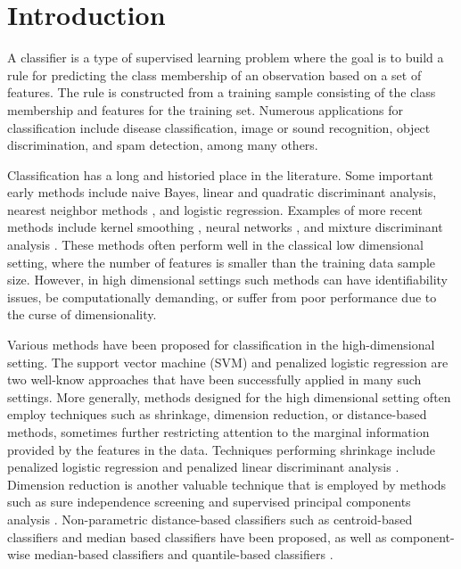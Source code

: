 
\section{Introduction}
\label{sec:intro}

A classifier is a type of supervised learning problem where the goal is to build
a rule for predicting the class membership of an observation based on a set of
features.  The rule is constructed from a training sample consisting of the
class membership and features for the training set.  Numerous applications for
classification include disease classification, image or sound recognition,
object discrimination, and spam detection, among many others.

Classification has a long and historied place in the literature.  Some important
early methods include naive Bayes, linear and quadratic discriminant analysis,
nearest neighbor methods \cite{cover1967}, and logistic regression.  Examples of
more recent methods include kernel smoothing \cite{mika1999}, neural networks
\cite{ripley1994}, and mixture discriminant analysis \cite{hastie1996}.  These
methods often perform well in the classical low dimensional setting, where the
number of features is smaller than the training data sample size.  However, in
high dimensional settings such methods can have identifiability issues, be
computationally demanding, or suffer from poor performance due to the curse of
dimensionality.

Various methods have been proposed for classification in the high-dimensional
setting.  The support vector machine (SVM) \cite{cortes1995} and penalized
logistic regression \cite{park2007} are two well-know approaches that have been
successfully applied in many such settings.  More generally, methods designed
for the high dimensional setting often employ techniques such as shrinkage,
dimension reduction, or distance-based methods, sometimes further restricting
attention to the marginal information provided by the features in the data.
Techniques performing shrinkage include penalized logistic regression and
penalized linear discriminant analysis \cite{tibshirani2002, clemmensen2011,
  witten2011}.  Dimension reduction is another valuable technique that is
employed by methods such as sure independence screening \cite{fan2008} and
supervised principal components analysis \cite{bair2006}.  Non-parametric
distance-based classifiers such as centroid-based classifiers
\cite{tibshirani2002} and median based classifiers \cite{jornsten2004,
  ghosh2005} have been proposed, as well as component-wise median-based
classifiers \cite{hall2012} and quantile-based classifiers \cite{hennig2016}.

